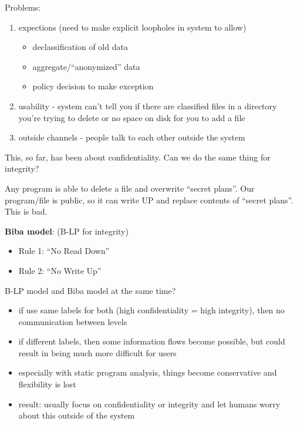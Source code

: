 Problems:
\begin{enumerate}
    \item expections (need to make explicit loopholes in system to allow)
    \begin{itemize}
        \item declassification of old data
        \item aggregate/``anonymized'' data
        \item policy decision to make exception
    \end{itemize}
    \item usability - system can't tell you if there are classified files in a
        directory you're trying to delete or no space on disk for you to add a
        file
    \item outside channels - people talk to each other outside the system
\end{enumerate}

This, so far, has been about confidentiality. Can we do the same thing for
integrity?

\begin{example}
Any program is able to delete a file and overwrite ``secret plans''. Our program/file
is public, so it can write UP and replace contents of ``secret plans''. This is bad.
\end{example}

{\bf Biba model}: (B-LP for integrity)
\begin{itemize}
    \item Rule 1: ``No Read Down''
    \item Rule 2: ``No Write Up''
\end{itemize}

B-LP model and Biba model at the same time?
\begin{itemize}
    \item if use same labels for both (high confidentiality = high integrity),
        then no communication between levels
    \item if different labels, then some information flows become possible, but
        could result in being much more difficult for users
    \item especially with static program analysis, things become conservative
        and flexibility is lost
    \item result: usually focus on confidentiality or integrity and let humans
        worry about this outside of the system
\end{itemize}


